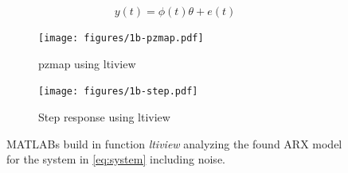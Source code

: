 \documentclass[]{article}
\begin{document}
\begin{equation}
	\label{eq:}
	y(t) = \phi(t) \theta + e(t)
\end{equation}


\begin{figure}[ht]
\centering
\begin{subfigure}{.49\textwidth}
	\centering
	\texttt{[image: figures/1b-pzmap.pdf]}
	\caption{pzmap using ltiview}
	\label{fig:1b-pzmap}
\end{subfigure}
\begin{subfigure}{.49\textwidth}
	\centering
	\texttt{[image: figures/1b-step.pdf]}
	\caption{Step response using ltiview}
	\label{fig:1b-step}
\end{subfigure}
\caption{MATLABs build in function \emph{ltiview} analyzing the found ARX model for the system in \eqref{eq:system} including noise.}
\label{fig:1b-ltiview}
\end{figure}

\fi
\end{document}
